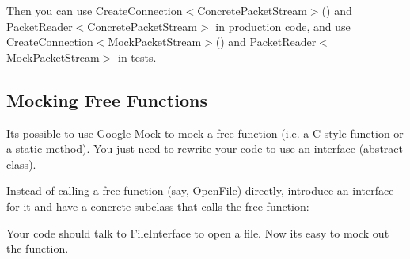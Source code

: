 \begin{DoxyCode}{0}
\DoxyCodeLine{}
\DoxyCodeLine{\};}
\end{DoxyCode}


Then you can use {\ttfamily Create\+Connection$<$Concrete\+Packet\+Stream$>$()} and {\ttfamily Packet\+Reader$<$Concrete\+Packet\+Stream$>$} in production code, and use {\ttfamily Create\+Connection$<$Mock\+Packet\+Stream$>$()} and {\ttfamily Packet\+Reader$<$Mock\+Packet\+Stream$>$} in tests.


\begin{DoxyCode}{0}
\end{DoxyCode}


\subsection*{Mocking Free Functions}

It\textquotesingle{}s possible to use Google \mbox{\hyperlink{class_mock}{Mock}} to mock a free function (i.\+e. a C-\/style function or a static method). You just need to rewrite your code to use an interface (abstract class).

Instead of calling a free function (say, {\ttfamily Open\+File}) directly, introduce an interface for it and have a concrete subclass that calls the free function\+:


\begin{DoxyCode}{0}
\DoxyCodeLine{\};}
\DoxyCodeLine{}
\DoxyCodeLine{  \}}
\DoxyCodeLine{\};}
\end{DoxyCode}


Your code should talk to {\ttfamily File\+Interface} to open a file. Now it\textquotesingle{}s easy to mock out the function.

